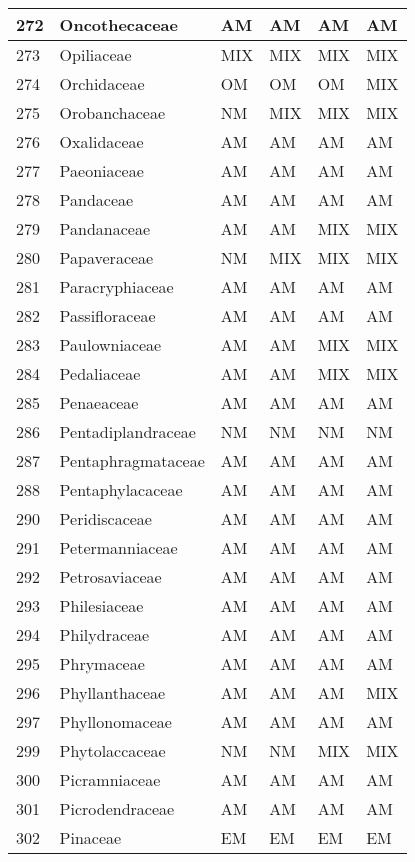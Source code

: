 \documentclass[]{article}
\begin{document}
\begin{longtable}{l|l|l|l|l|l}
\hline
272 & Oncothecaceae & AM & AM & AM & AM\\
\hline
273 & Opiliaceae & MIX & MIX & MIX & MIX\\
\hline
274 & Orchidaceae & OM & OM & OM & MIX\\
\hline
275 & Orobanchaceae & NM & MIX & MIX & MIX\\
\hline
276 & Oxalidaceae & AM & AM & AM & AM\\
\hline
277 & Paeoniaceae & AM & AM & AM & AM\\
\hline
278 & Pandaceae & AM & AM & AM & AM\\
\hline
279 & Pandanaceae & AM & AM & MIX & MIX\\
\hline
280 & Papaveraceae & NM & MIX & MIX & MIX\\
\hline
281 & Paracryphiaceae & AM & AM & AM & AM\\
\hline
282 & Passifloraceae & AM & AM & AM & AM\\
\hline
283 & Paulowniaceae & AM & AM & MIX & MIX\\
\hline
284 & Pedaliaceae & AM & AM & MIX & MIX\\
\hline
285 & Penaeaceae & AM & AM & AM & AM\\
\hline
286 & Pentadiplandraceae & NM & NM & NM & NM\\
\hline
287 & Pentaphragmataceae & AM & AM & AM & AM\\
\hline
288 & Pentaphylacaceae & AM & AM & AM & AM\\
\hline
290 & Peridiscaceae & AM & AM & AM & AM\\
\hline
291 & Petermanniaceae & AM & AM & AM & AM\\
\hline
292 & Petrosaviaceae & AM & AM & AM & AM\\
\hline
293 & Philesiaceae & AM & AM & AM & AM\\
\hline
294 & Philydraceae & AM & AM & AM & AM\\
\hline
295 & Phrymaceae & AM & AM & AM & AM\\
\hline
296 & Phyllanthaceae & AM & AM & AM & MIX\\
\hline
297 & Phyllonomaceae & AM & AM & AM & AM\\
\hline
299 & Phytolaccaceae & NM & NM & MIX & MIX\\
\hline
300 & Picramniaceae & AM & AM & AM & AM\\
\hline
301 & Picrodendraceae & AM & AM & AM & AM\\
\hline
302 & Pinaceae & EM & EM & EM & EM\\
\hline

\end{longtable}
\end{document}
